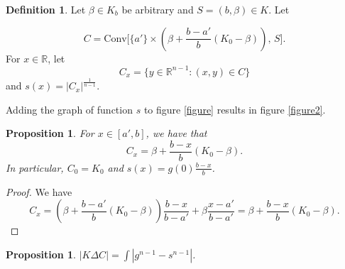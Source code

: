 \documentclass[12pt,reqno]{amsart}
\newcommand{\R}{\mathbb{R}}
\theoremstyle{plain}
\newtheorem{prop}[teor]{Proposition}
\theoremstyle{definition}
\newtheorem{defi}[teor]{Definition}
\theoremstyle{remark}
\numberwithin{equation}{section}
\begin{document}
\begin{defi}
    Let $\beta\in K_b$ be arbitrary and $S=(b,\beta)\in K$. Let
    
    $$C=\text{Conv}\Bigg[\{a'\}\times \left(\beta + \frac{b-a'}{b}(K_0-\beta)\right), \,S\Bigg].$$
    For $x\in \R$, let $$C_x=\{y\in \mathbb{R}^{n-1}:(x,y)\in C\}$$ and $s(x)=|C_x|^\frac 1{n-1}$.
\end{defi}
Adding the graph of function $s$ to figure \ref{figure} results in figure \ref{figure2}.
\begin{prop}
    For $x\in [a', b]$, we have that$$C_x = \beta + \frac{b-x}{b}(K_0-\beta).$$
    In particular, $C_0=K_0$ and $s(x)=g(0)\frac{b-x}{b}$.
\end{prop}
\begin{proof}
    We have $$C_x=\left(\beta + \frac{b-a'}{b}(K_0-\beta)\right)\frac {b-x}{b-a'}+\beta \frac {x-a'}{b-a'}=\beta + \frac{b-x}{b}(K_0-\beta).$$
\end{proof}
\begin{prop}
    $|K\Delta C|=\int |g^{n-1}-s^{n-1}|$.
\end{prop}
\end{document}
